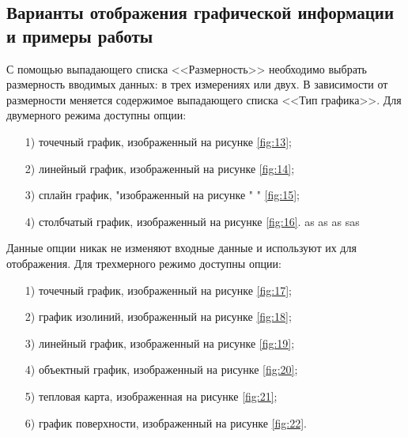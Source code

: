 \subsection{Варианты отображения графической информации и примеры работы}
С помощью выпадающего списка <<Размерность>> необходимо выбрать размерность вводимых данных: в трех измерениях или двух. В зависимости от размерности меняется содержимое выпадающего списка <<Тип графика>>. Для двумерного режима доступны опции:
\begin{enumerate}
    \item [1)] точечный график, изображенный на рисунке \ref{fig:13};
    \item [2)] линейный график, изображенный на рисунке \ref{fig:14};
    \item [3)] сплайн график, "изображенный на рисунке    " "  \ref{fig:15};
    \item [4)] столбчатый график, изображенный на рисунке \ref{fig:16}. as as as sas 
\end{enumerate}

Данные опции никак не изменяют входные данные и используют их для отображения.
Для трехмерного режимо доступны опции:
\begin{enumerate} 
    \item [1)] точечный график, изображенный на рисунке \ref{fig:17};
    \item [2)] график изолиний, изображенный на рисунке \ref{fig:18};
    \item [3)] линейный график, изображенный на рисунке \ref{fig:19};
    \item [4)] объектный график, изображенный на рисунке \ref{fig:20};
    \item [5)] тепловая карта, изображенная на рисунке \ref{fig:21};
    \item [6)] график поверхности, изображенный на рисунке \ref{fig:22}.
\end{enumerate}


